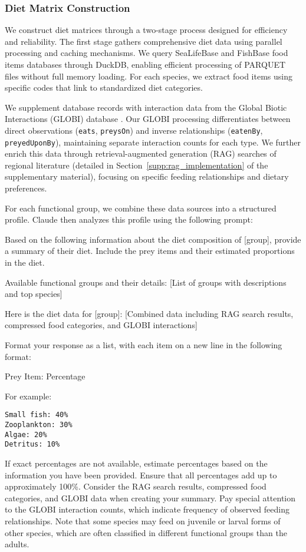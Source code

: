 \subsubsection{Diet Matrix Construction}

We construct diet matrices through a two-stage process designed for efficiency and reliability. The first stage gathers comprehensive diet data using parallel processing and caching mechanisms. We query SeaLifeBase and FishBase \citep{froese2010fishbase} food items databases through DuckDB, enabling efficient processing of PARQUET files without full memory loading. For each species, we extract food items using specific codes that link to standardized diet categories.

We supplement database records with interaction data from the Global Biotic Interactions (GLOBI) database \citep{Poelen2014}. Our GLOBI processing differentiates between direct observations (\texttt{eats}, \texttt{preysOn}) and inverse relationships (\texttt{eatenBy}, \texttt{preyedUponBy}), maintaining separate interaction counts for each type. We further enrich this data through retrieval-augmented generation (RAG) searches of regional literature (detailed in Section~\ref{supp:rag_implementation} of the supplementary material), focusing on specific feeding relationships and dietary preferences.

For each functional group, we combine these data sources into a structured profile. Claude \citep{Anthropic2024} then analyzes this profile using the following prompt:

\begin{prompt}
Based on the following information about the diet composition of [group], provide a summary of their diet. Include the prey items and their estimated proportions in the diet.

Available functional groups and their details:
[List of groups with descriptions and top species]

Here is the diet data for [group]:
[Combined data including RAG search results, compressed food categories, and GLOBI interactions]

Format your response as a list, with each item on a new line in the following format:

Prey Item: Percentage

For example:
\begin{verbatim}
Small fish: 40%
Zooplankton: 30%
Algae: 20%
Detritus: 10%
\end{verbatim}

If exact percentages are not available, estimate percentages based on the information you have been provided.
Ensure that all percentages add up to approximately 100\%.
Consider the RAG search results, compressed food categories, and GLOBI data when creating your summary.
Pay special attention to the GLOBI interaction counts, which indicate frequency of observed feeding relationships.
Note that some species may feed on juvenile or larval forms of other species, which are often classified in different functional groups than the adults.
\end{prompt}

